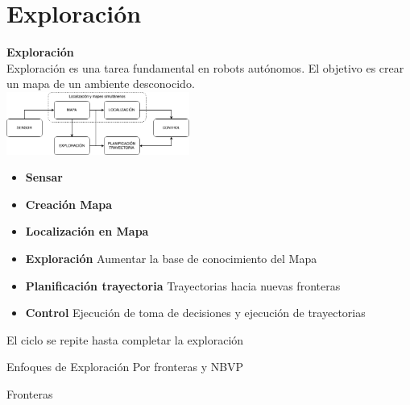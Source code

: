 \documentclass[
  24pt, %
  aspectratio=169, %
]{beamer}
\begin{document}
\section{Exploración}

\begin{frame}
  \textbf{Exploración}\\
  \bigskip %
  Exploración es una tarea fundamental en robots autónomos. El objetivo es crear un mapa de un ambiente desconocido.\\
  \bigskip %
  \centering
  \includegraphics[width=6cm]{exploracion}\\
  
  \begin{itemize}
  \item \textbf{Sensar} 
  \item \textbf{Creación Mapa} 
  \item \textbf{Localización en Mapa}
  \item \textbf{Exploración} Aumentar la base de conocimiento del Mapa
  \item \textbf{Planificación trayectoria} Trayectorias hacia nuevas fronteras 
  \item \textbf{Control} Ejecución de toma de decisiones y ejecución de trayectorias 
  \end{itemize}

  \pause \alert{El ciclo se repite hasta completar la exploración}
  
\end{frame}

\begin{frame}
  Enfoques de Exploración Por fronteras y NBVP
\end{frame}

\begin{frame}
  Fronteras
\end{frame}
\end{document}
